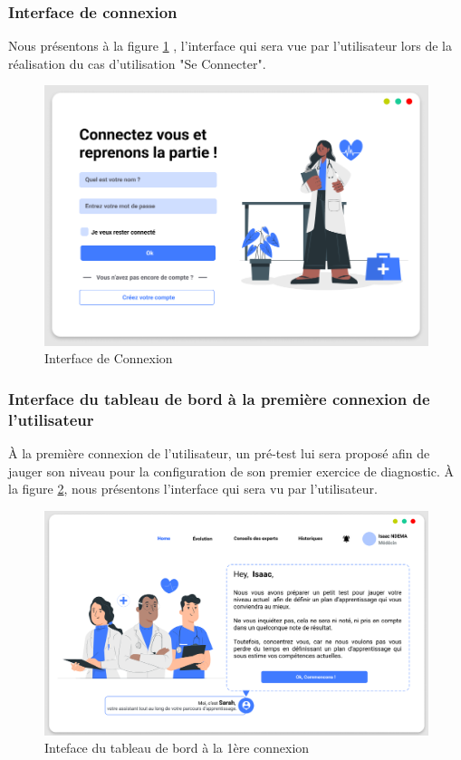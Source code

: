 \subsubsection{Interface de connexion}
Nous présentons à la figure \ref{fig:in_connection}  , l'interface qui sera vue par l'utilisateur lors de la réalisation du cas d'utilisation "Se Connecter".
\begin{figure}[H]
    \centering
    \includegraphics[width=\textwidth]{figures/signin.png}
    \captionsetup{justification=centering}
    \caption{Interface de Connexion}
    \label{fig:in_connection}
\end{figure}

\subsubsection{Interface du tableau de bord à la première connexion de l'utilisateur}
À la première connexion de l'utilisateur, un pré-test lui sera proposé afin de jauger son niveau pour la configuration de son premier exercice de diagnostic. À la figure \ref{fig:dashboard_first}, nous présentons l'interface qui sera vu par l'utilisateur.
\begin{figure}[H]
    \centering
    \includegraphics[width=\textwidth]{figures/dashboard-first-connection.png}
        \captionsetup{justification=centering}
    \caption{Inteface du tableau de bord à la 1ère connexion}
    \label{fig:dashboard_first}
\end{figure}

